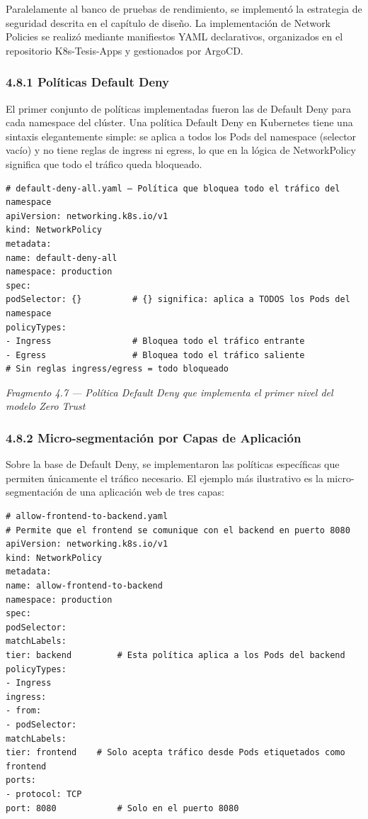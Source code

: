 \documentclass[journal]{IEEEtran}
\begin{document}
Paralelamente al banco de pruebas de rendimiento, se implementó la estrategia de seguridad descrita en el capítulo de diseño. La implementación de Network Policies se realizó mediante manifiestos YAML declarativos, organizados en el repositorio K8s-Tesis-Apps y gestionados por ArgoCD.

\subsubsection{4.8.1 Políticas Default Deny}

El primer conjunto de políticas implementadas fueron las de Default Deny para cada namespace del clúster. Una política Default Deny en Kubernetes tiene una sintaxis elegantemente simple: se aplica a todos los Pods del namespace (selector vacío) y no tiene reglas de ingress ni egress, lo que en la lógica de NetworkPolicy significa que todo el tráfico queda bloqueado.

\begin{lstlisting}[basicstyle=\ttfamily\scriptsize,breaklines=true]
# default-deny-all.yaml — Política que bloquea todo el tráfico del namespace
apiVersion: networking.k8s.io/v1
kind: NetworkPolicy
metadata:
name: default-deny-all
namespace: production
spec:
podSelector: {}          # {} significa: aplica a TODOS los Pods del namespace
policyTypes:
- Ingress                # Bloquea todo el tráfico entrante
- Egress                 # Bloquea todo el tráfico saliente
# Sin reglas ingress/egress = todo bloqueado
\end{lstlisting}

\begin{center}\emph{\emph{Fragmento 4.7 --- Política Default Deny que implementa el primer nivel del modelo Zero Trust}}\end{center}

\subsubsection{4.8.2 Micro-segmentación por Capas de Aplicación}

Sobre la base de Default Deny, se implementaron las políticas específicas que permiten únicamente el tráfico necesario. El ejemplo más ilustrativo es la micro-segmentación de una aplicación web de tres capas:

\begin{lstlisting}[basicstyle=\ttfamily\scriptsize,breaklines=true]
# allow-frontend-to-backend.yaml
# Permite que el frontend se comunique con el backend en puerto 8080
apiVersion: networking.k8s.io/v1
kind: NetworkPolicy
metadata:
name: allow-frontend-to-backend
namespace: production
spec:
podSelector:
matchLabels:
tier: backend         # Esta política aplica a los Pods del backend
policyTypes:
- Ingress
ingress:
- from:
- podSelector:
matchLabels:
tier: frontend    # Solo acepta tráfico desde Pods etiquetados como frontend
ports:
- protocol: TCP
port: 8080            # Solo en el puerto 8080
\end{lstlisting}
\end{document}
